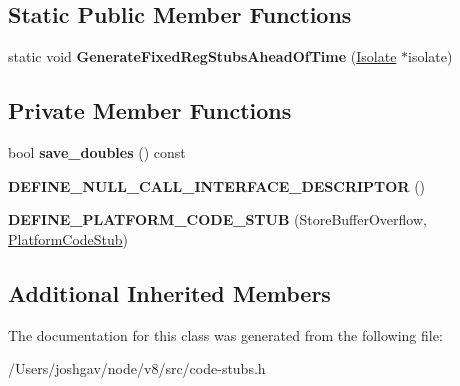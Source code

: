 \subsection*{Static Public Member Functions}
\begin{DoxyCompactItemize}
\item 
static void {\bfseries Generate\+Fixed\+Reg\+Stubs\+Ahead\+Of\+Time} (\hyperlink{classv8_1_1internal_1_1_isolate}{Isolate} $\ast$isolate)\hypertarget{classv8_1_1internal_1_1_store_buffer_overflow_stub_a047224fa89a9d554424af67a8cb98153}{}\label{classv8_1_1internal_1_1_store_buffer_overflow_stub_a047224fa89a9d554424af67a8cb98153}

\end{DoxyCompactItemize}
\subsection*{Private Member Functions}
\begin{DoxyCompactItemize}
\item 
bool {\bfseries save\+\_\+doubles} () const \hypertarget{classv8_1_1internal_1_1_store_buffer_overflow_stub_add5d525ff08d126fece6d0e1642e4f6d}{}\label{classv8_1_1internal_1_1_store_buffer_overflow_stub_add5d525ff08d126fece6d0e1642e4f6d}

\item 
{\bfseries D\+E\+F\+I\+N\+E\+\_\+\+N\+U\+L\+L\+\_\+\+C\+A\+L\+L\+\_\+\+I\+N\+T\+E\+R\+F\+A\+C\+E\+\_\+\+D\+E\+S\+C\+R\+I\+P\+T\+OR} ()\hypertarget{classv8_1_1internal_1_1_store_buffer_overflow_stub_a8d71c0661aa2f3066f379d595fa1489b}{}\label{classv8_1_1internal_1_1_store_buffer_overflow_stub_a8d71c0661aa2f3066f379d595fa1489b}

\item 
{\bfseries D\+E\+F\+I\+N\+E\+\_\+\+P\+L\+A\+T\+F\+O\+R\+M\+\_\+\+C\+O\+D\+E\+\_\+\+S\+T\+UB} (Store\+Buffer\+Overflow, \hyperlink{classv8_1_1internal_1_1_platform_code_stub}{Platform\+Code\+Stub})\hypertarget{classv8_1_1internal_1_1_store_buffer_overflow_stub_acf668d077f1d912957801590df2bb6e8}{}\label{classv8_1_1internal_1_1_store_buffer_overflow_stub_acf668d077f1d912957801590df2bb6e8}

\end{DoxyCompactItemize}
\subsection*{Additional Inherited Members}


The documentation for this class was generated from the following file\+:\begin{DoxyCompactItemize}
\item 
/\+Users/joshgav/node/v8/src/code-\/stubs.\+h\end{DoxyCompactItemize}
